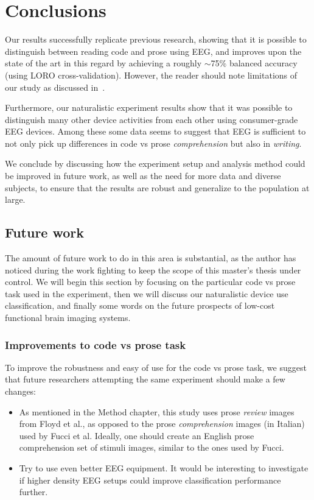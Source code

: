 \chapter{Conclusions}

Our results successfully replicate previous research, showing that it is possible to distinguish between reading code and prose using EEG, and improves upon the state of the art in this regard by achieving a roughly $\sim$75\% balanced accuracy (using LORO cross-validation). However, the reader should note limitations of our study as discussed in~.

Furthermore, our naturalistic experiment results show that it was possible to distinguish many other device activities from each other using consumer-grade EEG devices. Among these some data seems to suggest that EEG is sufficient to not only pick up differences in code vs prose \emph{comprehension} but also in \emph{writing}.

We conclude by discussing how the experiment setup and analysis method could be improved in future work, as well as the need for more data and diverse subjects, to ensure that the results are robust and generalize to the population at large.

\section{Future work}

The amount of future work to do in this area is substantial, as the author has noticed during the work fighting to keep the scope of this master's thesis under control. We will begin this section by focusing on the particular code vs prose task used in the experiment, then we will discuss our naturalistic device use classification, and finally some words on the future prospects of low-cost functional brain imaging systems.

\subsection{Improvements to code vs prose task}

\begin{minipage}{\textwidth}
To improve the robustness and easy of use for the code vs prose task, we suggest that future researchers attempting the same experiment should make a few changes:

\begin{itemize}
    \item As mentioned in the Method chapter, this study uses prose \emph{review} images from Floyd et al., as opposed to the prose \emph{comprehension} images (in Italian) used by Fucci et al. Ideally, one should create an English prose comprehension set of stimuli images, similar to the ones used by Fucci.
    \item Try to use even better EEG equipment. It would be interesting to investigate if higher density EEG setups could improve classification performance further.
\end{itemize}
\end{minipage}

